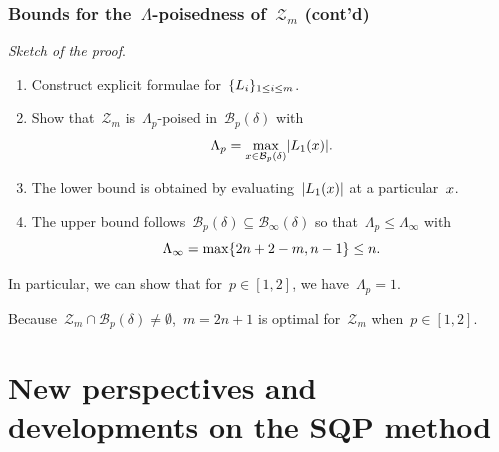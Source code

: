 \documentclass{polyu-presentation}
\newcommand{\iter}[1][]{x\ifthenelse{\equal{#1}{}}{}{^{#1}}}
\newcommand{\lagp}[1][]{L\ifthenelse{\equal{#1}{}}{}{_{#1}}}
\begin{document}
\begin{frame}
    \frametitle{Bounds for the~$\Lambda$-poisedness of~$\mathcal{Z}_m$ (cont'd)}

    \emph{Sketch of the proof}.
    \begin{enumerate}
        \item Construct explicit formulae for~$\set{\lagp[i]}_{1 \le i \le m}$.
        \item Show that~$\mathcal{Z}_m$ is~$\Lambda_p$-poised in~$\mathcal{B}_p(\delta)$ with
        \begin{equation*}
            \Lambda_p = \max_{\iter \in \mathcal{B}_p(\delta)} \abs{\lagp[1](\iter)}.
        \end{equation*}
        \item The lower bound is obtained by evaluating~$\abs{\lagp[1](\iter)}$ at a particular~$\iter$.
        \item The upper bound follows~$\mathcal{B}_p(\delta) \subseteq \mathcal{B}_{\infty}(\delta)$ so that~$\Lambda_p \le \Lambda_{\infty}$ with
        \begin{equation*}
            \Lambda_{\infty} = \max \{2n + 2 - m, n - 1\} \le n.
        \end{equation*}
    \end{enumerate}

    \smallskip

    In particular, we can show that for~$p \in [1, 2]$, we have~$\Lambda_p = 1$.

    \begin{block}{}
        Because~$\mathcal{Z}_m \cap \mathcal{B}_p(\delta) \neq \emptyset$,~$m = 2n + 1$ is \alert{optimal} for~$\mathcal{Z}_m$ when~$p \in [1, 2]$.
    \end{block}
\end{frame}

\section{New perspectives and developments on the SQP method}
\end{document}
